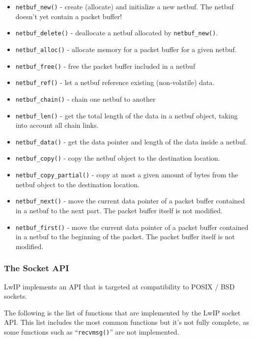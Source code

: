 \begin{itemize}
  \item \verb/netbuf_new()/ - create (allocate) and initialize a new netbuf. The netbuf doesn't yet contain a packet buffer!
  \item \verb/netbuf_delete()/ - deallocate a netbuf allocated by \verb/netbuf_new()/.
  \item \verb/netbuf_alloc()/ - allocate memory for a packet buffer for a given netbuf.
  \item \verb/netbuf_free()/ - free the packet buffer included in a netbuf
  \item \verb/netbuf_ref()/ - let a netbuf reference existing (non-volatile) data.
  \item \verb/netbuf_chain()/ - chain one netbuf to another
  \item \verb/netbuf_len()/ - get the total length of the data in a netbuf object, taking into account all chain links.
  \item \verb/netbuf_data()/ - get the data pointer and length of the data inside a netbuf.
  \item \verb/netbuf_copy()/ - copy the netbuf object to the destination location. 
  \item \verb/netbuf_copy_partial()/ - copy at most a given amount of bytes from the netbuf object to the destination location. 
  \item \verb/netbuf_next()/ - move the current data pointer of a packet buffer contained in a netbuf to the next part. The packet buffer itself is not modified.
  \item \verb/netbuf_first()/ - move the current data pointer of a packet buffer contained in a netbuf to the beginning of the packet. The packet buffer itself is not modified.
\end{itemize}

\subsubsection { The Socket API }

LwIP implements an API that is targeted at compatibility to POSIX / BSD sockets.

The following is the list of functions that are implemented by the LwIP socket API. This list includes the most common functions but it's not fully complete, as some functions such as ``\verb/recvmsg()/'' are not implemented.

